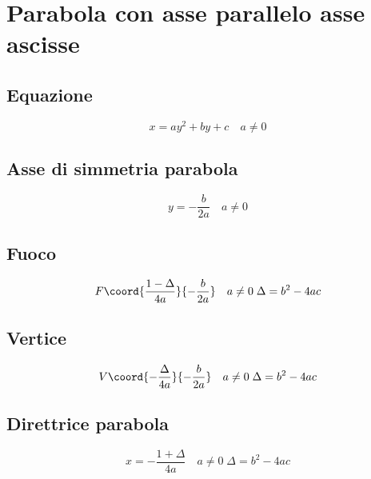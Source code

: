 \chapter{Parabola con asse parallelo asse ascisse}
\section{Equazione}
\begin{equation}
x=ay^2+by+c\quad a\neq0
\end{equation}
\section{Asse di simmetria parabola}
\begin{equation}
y=-\dfrac{b}{2a}\quad a\neq0
\end{equation}
\section{Fuoco}
\begin{equation}
F\coord{\dfrac{1-\Delta}{4a}}{-\dfrac{b}{2a}}\quad  a\neq0\; \Delta=b^2-4ac
\end{equation}
\section{Vertice}
\begin{equation}
V\coord{-\dfrac{\Delta}{4a}}{-\dfrac{b}{2a}}\quad  a\neq0\; \Delta=b^2-4ac
\end{equation}
\section{Direttrice parabola}
\begin{equation}
x=-\dfrac{1+\Delta}{4a}\quad  a\neq0\;\Delta=b^2-4ac
\end{equation}